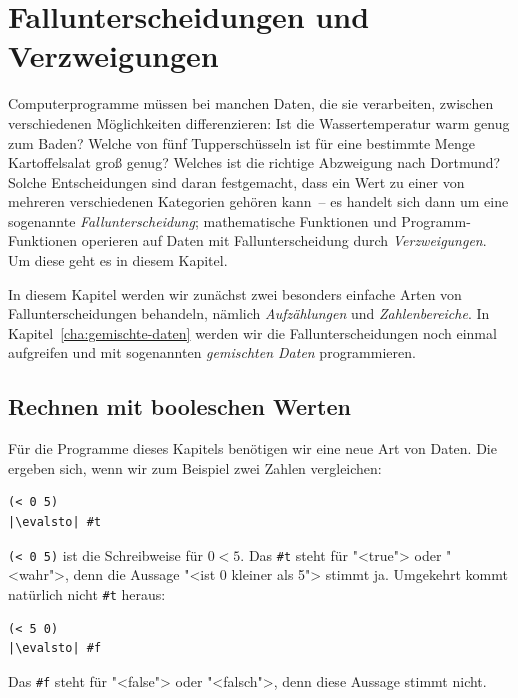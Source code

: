 
\chapter{Fallunterscheidungen und Verzweigungen}
\label{cha:conditionals}

Computerprogramme müssen bei manchen Daten, die sie
verarbeiten, zwischen verschiedenen Möglichkeiten differenzieren: Ist
die Wassertemperatur warm genug zum Baden?  Welche von fünf
Tupperschüsseln ist für eine bestimmte Menge Kartoffelsalat groß
genug?  Welches ist die richtige Abzweigung nach Dortmund?  Solche
Entscheidungen sind daran festgemacht, dass ein Wert zu einer von mehreren
verschiedenen 
Kategorien gehören kann~-- es handelt sich dann um eine sogenannte
\textit{Fallunterscheidung}; 
mathematische Funktionen und Programm-Funktionen operieren auf Daten mit
Fallunterscheidung durch \textit{Verzweigungen}.
Um diese geht es in diesem Kapitel.

In diesem Kapitel werden wir zunächst zwei besonders einfache Arten
von Fallunterscheidungen behandeln, nämlich \textit{Aufzählungen} und
\textit{Zahlenbereiche}.  In Kapitel~\ref{cha:gemischte-daten} werden
wir die Fallunterscheidungen noch einmal aufgreifen und mit
sogenannten \textit{gemischten Daten} programmieren.

\section{Rechnen mit booleschen Werten}

Für die Programme dieses Kapitels benötigen wir eine neue Art von
Daten.  Die ergeben sich, wenn wir zum Beispiel zwei Zahlen
vergleichen:
%
\begin{lstlisting}
(< 0 5)
|\evalsto| #t
\end{lstlisting}
%
\lstinline{(< 0 5)} ist die Schreibweise für $0 < 5$.  Das
\lstinline{#t} steht für "<true"> oder "<wahr">,
denn die Aussage "<ist 0 kleiner als 5"> stimmt ja.
Umgekehrt kommt natürlich nicht \lstinline{#t} heraus:
%
\begin{lstlisting}
(< 5 0)
|\evalsto| #f
\end{lstlisting}
%
Das \lstinline{#f} steht für "<false"> oder
"<falsch">, denn diese Aussage stimmt nicht.

